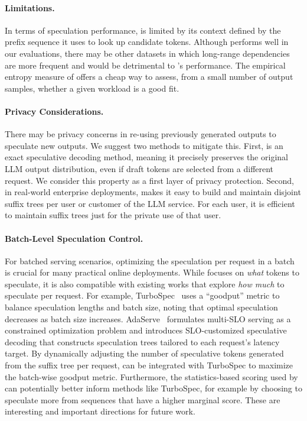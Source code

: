 \paragraph{Limitations.}
In terms of speculation performance, \SuffixDecoding is limited by its context defined by the prefix sequence it uses to look up candidate tokens. Although \SuffixDecoding performs well in our evaluations, there may be other datasets in which long-range dependencies are more frequent and would be detrimental to \SuffixDecoding's performance. The empirical entropy measure of  offers a cheap way to assess, from a small number of output samples, whether a given workload is a good fit.

\paragraph{Privacy Considerations.}
There may be privacy concerns in re-using previously generated outputs to speculate new outputs. We suggest two methods to mitigate this. First, \SuffixDecoding is an exact speculative decoding method, meaning it precisely preserves the original LLM output distribution, even if draft tokens are selected from a different request. We consider this property as a first layer of privacy protection. Second, in real-world enterprise deployments, \SuffixDecoding makes it easy to build and maintain disjoint suffix trees per user or customer of the LLM service. For each user, it is efficient to maintain suffix trees just for the private use of that user.

\paragraph{Batch-Level Speculation Control.}
\label{suffixdecoding:sec:batch-speculation}
For batched serving scenarios, optimizing the speculation per request in a batch is crucial for many practical online deployments. While \SuffixDecoding focuses on \textit{what} tokens to speculate, it is also compatible with existing works that explore \textit{how much} to speculate per request. For example, TurboSpec~\citep{turbospec} uses a ``goodput'' metric to balance speculation lengths and batch size, noting that optimal speculation decreases as batch size increases. AdaServe~\citep{adaserve} formulates multi-SLO serving as a constrained optimization problem and introduces SLO-customized speculative decoding that constructs speculation trees tailored to each request's latency target.
By dynamically adjusting the number of speculative tokens generated from the suffix tree per request, \SuffixDecoding can be integrated with TurboSpec to maximize the batch-wise goodput metric.
Furthermore, the statistics-based scoring used by \SuffixDecoding can potentially better inform methods like TurboSpec, for example by choosing to speculate more from sequences that have a higher marginal score.
These are interesting and important directions for future work.

